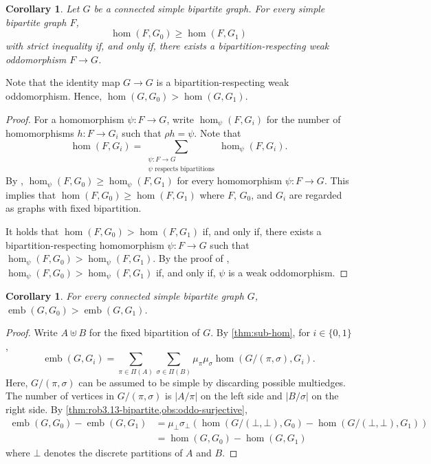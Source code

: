 \documentclass[10pt,a4paper]{article}
\theoremstyle{definition}
\theoremstyle{plain}
\newtheorem{corollary}[definition]{Corollary}
\theoremstyle{remark}
\DeclareMathOperator{\emb}{emb}
\begin{document}
	\begin{corollary}\label{thm:rob3.13-bipartite}
		Let $G$ be a connected simple bipartite graph.
		For every simple bipartite graph $F$,
		\[
		\hom(F, G_0) \geq \hom(F, G_1)
		\]
		with strict inequality if, and only if, there exists a bipartition-respecting weak oddomorphism $F \to G$.
	\end{corollary}
	Note that the identity map $G \to G$ is a bipartition-respecting weak oddomorphism. Hence, $\hom(G, G_0) > \hom(G, G_1)$.
	\begin{proof}
		For a homomorphism $\psi \colon F\to G$, write $\hom_\psi(F, G_i)$ for the number of homomorphisms $h \colon F \to G_i$ such that $\rho h = \psi$.
		Note that
		\[
			\hom(F, G_i) = \sum_{\substack{\psi \colon F \to G \\ \psi \text{ respects bipartitions}}} \hom_\psi(F, G_i). 
		\]
		By \cite[Theorem~3.6]{roberson_oddomorphisms_2022},
		$\hom_\psi(F, G_0) \geq \hom_\psi(F, G_1)$ for every homomorphism $\psi \colon F \to G$.
		This implies that $\hom(F, G_0) \geq \hom(F, G_1)$ where $F$, $G_0$, and $G_i$ are regarded as graphs with fixed bipartition.
		
		It holds that $\hom(F, G_0) > \hom(F, G_1)$ if, and only if, there exists a bipartition-respecting homomorphism $\psi \colon F\to G$ such that $\hom_\psi(F, G_0) > \hom_\psi(F, G_1)$.
		By the proof of \cite[Theorem~3.13]{roberson_oddomorphisms_2022}, $\hom_\psi(F, G_0) > \hom_\psi(F, G_1)$ if, and only if, $\psi$ is a weak oddomorphism.
	\end{proof}

	\begin{corollary}\label{cor:sub-cfi}
		For every connected simple bipartite graph $G$,
		$\emb(G, G_0) > \emb(G, G_1)$.
	\end{corollary}
	\begin{proof}
		Write $A \uplus B$ for the fixed bipartition of $G$.
		By \cref{thm:sub-hom}, for $i \in \{0,1\}$,
		\[
		\emb(G, G_i) = \sum_{\pi \in \Pi(A)} \sum_{\sigma \in \Pi(B)} \mu_\pi \mu_\sigma \hom(G/(\pi, \sigma), G_i).
		\]
		Here, $G/(\pi, \sigma)$ can be assumed to be simple by discarding possible multiedges.
		The number of vertices in $G/(\pi, \sigma)$ is $|A/\pi|$ on the left side and $|B/\sigma|$ on the right side.
		By \cref{thm:rob3.13-bipartite,obs:oddo-surjective},
		\begin{align*}
			\emb(G, G_0) - \emb(G, G_1) 
			&= \mu_\bot \sigma_\bot \left( \hom(G/(\bot, \bot), G_0) - \hom(G/(\bot, \bot), G_1) \right) \\
			&= \hom(G, G_0) - \hom(G, G_1)
		\end{align*}
		where $\bot$ denotes the discrete partitions of $A$ and $B$.
	\end{proof}
\end{document}
